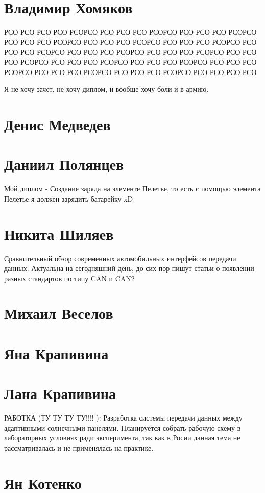\documentclass{article}
\begin{document}
\section*{Владимир Хомяков}
РСО РСО РСО РСО РСОРСО РСО РСО РСО РСОРСО РСО РСО РСО РСОРСО РСО РСО РСО РСОРСО РСО РСО РСО РСОРСО РСО РСО РСО РСОРСО РСО РСО РСО РСОРСО РСО РСО РСО РСОРСО РСО РСО РСО РСОРСО РСО РСО РСО РСОРСО РСО РСО РСО РСОРСО РСО РСО РСО РСОРСО РСО РСО РСО РСОРСО РСО РСО РСО РСОРСО РСО РСО РСО РСОРСО РСО РСО РСО РСО

Я не хочу зачёт, не хочу диплом, и вообще хочу боли и в армию.
\section*{Денис Медведев}

\section*{Даниил Полянцев}
Мой диплом - Создание заряда на элементе Пелетье, то есть с помощью элемента Пелетье я должен зарядить батарейку xD

\section*{Никита Шиляев}

Сравнительный обзор современных автомобильных интерфейсов передачи данных. Актуальна на сегодняшний день, до сих пор пишут статьи о появлении разных стандартов по типу CAN и CAN2

\section*{Михаил Веселов}

\section*{Яна Крапивина}

\section*{Лана Крапивина}
РАБОТКА (ТУ ТУ ТУ ТУ!!!! ): Разработка системы передачи данных между адаптивными солнечными панелями. Планируется собрать рабочую схему в лабораторных условиях ради эксперимента, так как в Росии данная тема не рассматривалась и не применялась на практике.

\section*{Ян Котенко}
\end{document}
